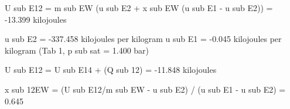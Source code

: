 U sub E12 = m sub EW (u sub E2 + x sub EW (u sub E1 - u sub E2)) = -13.399 kilojoules

u sub E2 = -337.458 kilojoules per kilogram  
u sub E1 = -0.045 kilojoules per kilogram  
(Tab 1, p sub sat = 1.400 bar)

U sub E12 = U sub E14 + (Q sub 12) = -11.848 kilojoules

x sub 12EW = (U sub E12/m sub EW - u sub E2) / (u sub E1 - u sub E2) = 0.645